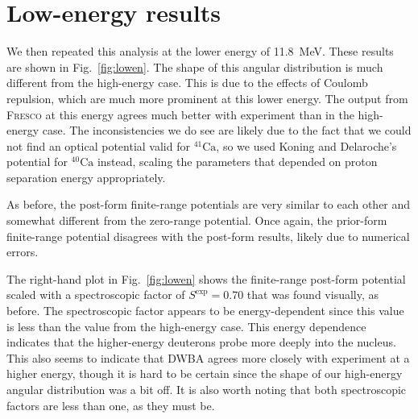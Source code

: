 \documentclass[aps, prc, reprint]{revtex4-1}
\newcommand{\nuc}[2]{\ensuremath{{}^{#1}\text{#2}}}
\newcommand{\fresco}[0]{\textsc{Fresco}\xspace}
\begin{document}
\section{Low-energy results}

We then repeated this analysis at the lower energy of \SI{11.8}{MeV}. These results are shown in Fig.~\ref{fig:lowen}. The shape of this angular distribution is much different from the high-energy case. This is due to the effects of Coulomb repulsion, which are much more prominent at this lower energy. The output from \fresco at this energy agrees much better with experiment than in the high-energy case. The inconsistencies we do see are likely due to the fact that we could not find an optical potential valid for \nuc{41}{Ca}, so we used Koning and Delaroche's potential for \nuc{40}{Ca} instead, scaling the parameters that depended on proton separation energy appropriately.

As before, the post-form finite-range potentials are very similar to each other and somewhat different from the zero-range potential. Once again, the prior-form finite-range potential disagrees with the post-form results, likely due to numerical errors.

The right-hand plot in Fig.~\ref{fig:lowen} shows the finite-range post-form potential scaled with a spectroscopic factor of $S^\text{exp} = 0.70$ that was found visually, as before. The spectroscopic factor appears to be energy-dependent since this value is less than the value from the high-energy case. This energy dependence indicates that the higher-energy deuterons probe more deeply into the nucleus. This also seems to indicate that DWBA agrees more closely with experiment at a higher energy, though it is hard to be certain since the shape of our high-energy angular distribution was a bit off. It is also worth noting that both spectroscopic factors are less than one, as they must be.


\end{document}
